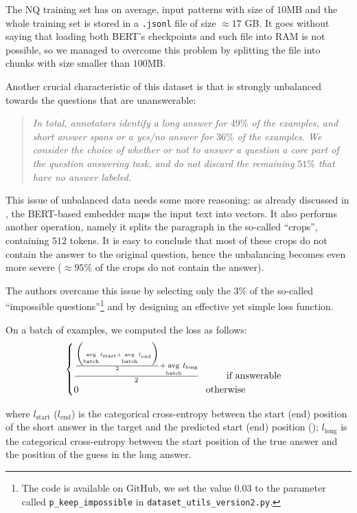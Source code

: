 \documentclass[10pt,hidelinks]{article}
\DeclareMathOperator*{\avg}{avg}
\begin{document}
The NQ training set has on average, input patterns with size of $10$MB and the whole training set is stored in a \texttt{.jsonl} file of size $\approx 17$ GB.
It goes without saying that loading both BERT's checkpoints and such file into RAM is not possible, so we managed to overcome this problem by splitting the file into chunks with size smaller than $100$MB.

Another crucial characteristic of this dataset is that is strongly unbalanced towards the questions that are unanswerable:
\blockquote{\it In total, annotators identify a long answer for $49\%$ of the examples, and short answer spans or a yes/no answer for $36\%$ of the examples. We consider the choice of whether or not to answer a question a core part of the question answering task, and do not discard the remaining $51\%$ that have no answer labeled.\cite{kwiatowski}}
	
This issue of unbalanced data needs some more reasoning: as already discussed in , the BERT-based embedder maps the input text into vectors. It also performs another operation, namely it splits the paragraph in the so-called ``crops'', containing $512$ tokens.
It is easy to conclude that most of these crops do not contain the answer to the original question, hence the unbalancing becomes even more severe ($\approx 95\%$ of the crops do not contain the answer).

The authors overcame this issue by selecting only the $3\%$ of the so-called ``impossible questions''\footnote{The code is available on GitHub, we set the value $0.03$ to the parameter called \texttt{p\_keep\_impossible} in \texttt{dataset\_utils\_version2.py}.} and by designing an effective yet simple loss function.

On a batch of examples, we computed the loss as follows:
\begin{equation}\label{eq:loss}
\begin{cases}
\frac{\frac{\biggl ( \avg\limits_{\text{batch}} l_\text{start} + \avg\limits_{\text{batch}} l_\text{end}  \biggr )}{2} + \avg\limits_{\text{batch}} l_\text{long}}{2} \hspace{1cm}\text{if answerable}\\
0 \hspace{4.65cm} \text{otherwise}
\end{cases}
\end{equation}
 
 where $l_{\text{start}}$ ($l_{\text{end}}$)  is the categorical cross-entropy between the start (end) position of the short answer in the target and the predicted start (end) position (); $l_{\text{long}}$ is the categorical cross-entropy between the start position of the true answer and the position of the guess in the long answer.
\end{document}
